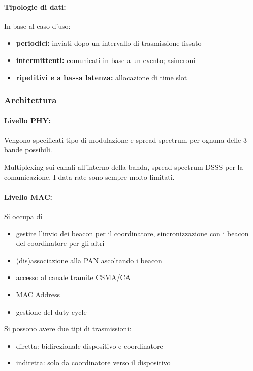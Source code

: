 \paragraph{Tipologie di dati:} In base al caso d'uso: 
\begin{itemize}
    \item \textbf{periodici:} inviati dopo un intervallo di trasmissione fissato
    
    \item \textbf{intermittenti:} comunicati in base a un evento; asincroni
    
    \item \textbf{ripetitivi e a bassa latenza:} allocazione di time slot
\end{itemize}

\subsubsection{Architettura}

\paragraph{Livello PHY:} Vengono specificati tipo di modulazione e spread spectrum per ognuna delle 3 bande possibili.

Multiplexing sui canali all'interno della banda, spread spectrum DSSS per la comunicazione. I data rate sono sempre molto limitati.

\paragraph{Livello MAC:} Si occupa di
\begin{itemize}
    \item gestire l'invio dei beacon per il coordinatore, sincronizzazione con i beacon del coordinatore per gli altri 
    
    \item (dis)associazione alla PAN ascoltando i beacon
    
    \item accesso al canale tramite CSMA/CA
    
    \item MAC Address 
    
    \item gestione del duty cycle
\end{itemize}

Si possono avere due tipi di trasmissioni: 
\begin{itemize}
    \item diretta: bidirezionale dispositivo e coordinatore
    
    \item indiretta: solo da coordinatore verso il dispositivo
\end{itemize}

